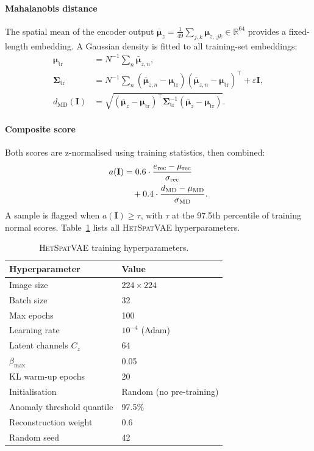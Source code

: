 \documentclass[preprint,12pt,3p]{elsarticle}
\newcommand{\hetspatvae}{\textsc{HetSpatVAE}\xspace} %
\newcommand{\hczv}{\hetspatvae}                    %
\newcommand{\R}{\mathbb{R}}
\newcommand{\bI}{\mathbf{I}}
\newcommand{\bmu}{\boldsymbol{\mu}}
\newcommand{\bSigma}{\boldsymbol{\Sigma}}
\begin{document}
\paragraph{Mahalanobis distance}
The spatial mean of the encoder output
$\bar{\bmu}_z = \frac{1}{49}\sum_{j,k} \bmu_{z,\cdot jk} \in \R^{64}$
provides a fixed-length embedding.
A Gaussian density is fitted to all training-set embeddings:
%
\begin{align}
  \bmu_\mathrm{tr} &= N^{-1}\textstyle\sum_n \bar{\bmu}_{z,n}, \\
  \bSigma_\mathrm{tr} &=
    N^{-1}\textstyle\sum_n
    (\bar{\bmu}_{z,n} - \bmu_\mathrm{tr})
    (\bar{\bmu}_{z,n} - \bmu_\mathrm{tr})^\top
    + \varepsilon\mathbf{I}, \\
  d_\mathrm{MD}(\bI) &= \sqrt{
    (\bar{\bmu}_z - \bmu_\mathrm{tr})^\top
    \bSigma_\mathrm{tr}^{-1}
    (\bar{\bmu}_z - \bmu_\mathrm{tr})
  }.
  \label{eq:md}
\end{align}

\paragraph{Composite score}
Both scores are z-normalised using training statistics, then combined:
%
\begin{align}
  a(\bI) &=
  0.6 \cdot \frac{e_\mathrm{rec} - \mu_\mathrm{rec}}
                  {\sigma_\mathrm{rec}} \notag \\
  &\quad {}+ 0.4 \cdot
  \frac{d_\mathrm{MD} - \mu_\mathrm{MD}}{\sigma_\mathrm{MD}}.
  \label{eq:score}
\end{align}
%
A sample is flagged when $a(\bI) \geq \tau$, with $\tau$ at the
97.5th percentile of training normal scores.
Table~\ref{tab:hyper_vae} lists all \hczv hyperparameters.

\begin{table}[H]
  \centering
  \small
  \caption{\hczv training hyperparameters.}
  \label{tab:hyper_vae}
  \renewcommand{\arraystretch}{1.2}
  \begin{tabular}{@{}lp{3.8cm}@{}}
    \toprule
    Hyperparameter & Value \\
    \midrule
    Image size                  & $224 \times 224$ \\
    Batch size                  & 32 \\
    Max epochs                  & 100 \\
    Learning rate               & $10^{-4}$ (Adam) \\
    Latent channels $C_z$       & 64 \\
    $\beta_{\max}$              & 0.05 \\
    KL warm-up epochs           & 20 \\
    Initialisation              & Random (no pre-training) \\
    Anomaly threshold quantile  & 97.5\% \\
    Reconstruction weight       & 0.6 \\
    Random seed                 & 42 \\
    \bottomrule
  \end{tabular}
\end{table}
\end{document}
